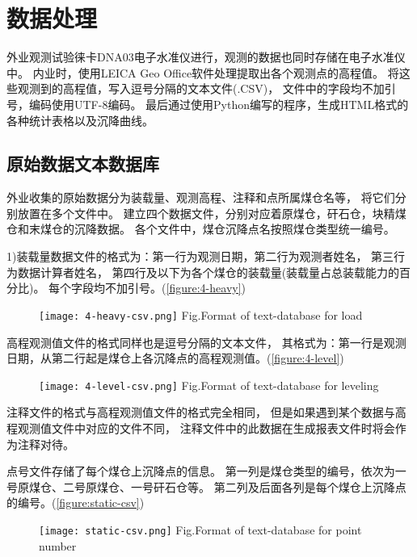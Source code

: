 \section{数据处理}
外业观测试验徕卡DNA03电子水准仪进行，观测的数据也同时存储在电子水准仪中。
内业时，使用LEICA Geo Office软件处理提取出各个观测点的高程值。
将这些观测到的高程值，写入逗号分隔的文本文件(.CSV)，
文件中的字段均不加引号，编码使用UTF-8编码。
最后通过使用Python编写的程序，生成HTML格式的各种统计表格以及沉降曲线。

\subsection{原始数据文本数据库}
外业收集的原始数据分为装载量、观测高程、注释和点所属煤仓名等，
将它们分别放置在多个文件中。
建立四个数据文件，分别对应着原煤仓，矸石仓，块精煤仓和末煤仓的沉降数据。
各个文件中，煤仓沉降点名按照煤仓类型统一编号。

1)装载量数据文件的格式为：第一行为观测日期，第二行为观测者姓名，
第三行为数据计算者姓名，
第四行及以下为各个煤仓的装载量(装载量占总装载能力的百分比)。
每个字段均不加引号。(\ref{figure:4-heavy})
\begin{figure}[!htbp]
   \centering
   \texttt{[image: 4-heavy-csv.png]}
			{Fig.}{Format of text-database for load}
\end{figure}

高程观测值文件的格式同样也是逗号分隔的文本文件，
其格式为：第一行是观测日期，从第二行起是煤仓上各沉降点的高程观测值。(\ref{figure:4-level})
\begin{figure}[!htbp]
   \centering
   \texttt{[image: 4-level-csv.png]}
			{Fig.}{Format of text-database for leveling}
\end{figure}

注释文件的格式与高程观测值文件的格式完全相同，
但是如果遇到某个数据与高程观测值文件中对应的文件不同，
注释文件中的此数据在生成报表文件时将会作为注释对待。

点号文件存储了每个煤仓上沉降点的信息。
第一列是煤仓类型的编号，依次为一号原煤仓、二号原煤仓、一号矸石仓等。
第二列及后面各列是每个煤仓上沉降点的编号。(\ref{figure:static-csv})
\begin{figure}[!htbp]
   \centering
   \texttt{[image: static-csv.png]}
			{Fig.}{Format of text-database for point number}
\end{figure}

